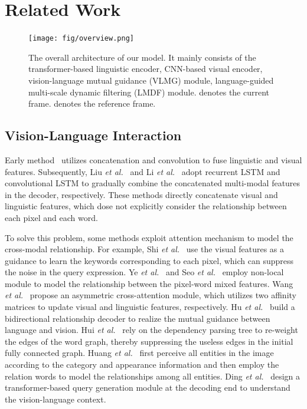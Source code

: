 \documentclass[10pt,twocolumn,letterpaper]{article}
\begin{document}
\section{Related Work}
\label{sec:related}

\begin{figure*}[t]
\centering
\texttt{[image: fig/overview.png]}
\ \\
{\begin{center}
\vspace{-3mm}
\caption{\small{The overall architecture of our model. It mainly consists of the transformer-based linguistic encoder, CNN-based visual encoder, vision-language mutual guidance (VLMG) module, language-guided multi-scale dynamic filtering (LMDF) module.  denotes the current frame.  denotes the reference frame.}}
\label{fig:structure}
\end{center}
}
\vspace{-2mm}
\end{figure*}
\subsection{Vision-Language Interaction}
Early method~\cite{hu2016segmentation} utilizes concatenation and convolution to fuse linguistic and visual features. Subsequently, Liu \emph{et al.}~\cite{liu2017recurrent} and Li \emph{et al.}~\cite{li2018referring} adopt recurrent LSTM and convolutional LSTM to gradually combine the concatenated multi-modal features in the decoder, respectively. These methods directly concatenate visual and linguistic features, which dose not explicitly consider the relationship between each pixel and each word.

To solve this problem, some methods exploit attention mechanism to model the cross-modal relationship. For example, Shi \emph{et al.}~\cite{shi2018key} use the visual features as a guidance to learn the keywords corresponding to each pixel, which can suppress the noise in the query expression. Ye \emph{et al.}~\cite{ye2019cross} and Seo \emph{et al.}~\cite{seo2020urvos} employ non-local module to model the relationship between the pixel-word mixed features. Wang \emph{et al.}~\cite{wang2019asymmetric} propose an asymmetric cross-attention module, which utilizes two affinity matrices to update visual and linguistic features, respectively. Hu \emph{et al.}~\cite{hu2020bi} build a bidirectional relationship decoder to realize the mutual guidance between language and vision. Hui \emph{et al.}~\cite{hui2020linguistic} rely on the dependency parsing tree to re-weight the edges of the word graph, thereby suppressing the useless edges in the initial fully connected graph. Huang \emph{et al.}~\cite{huang2020referring} first perceive all entities in the image according to the category and appearance information and then employ the relation words to model the relationships among all entities.  Ding \emph{et al.}~\cite{ding2021vision} design a transformer-based query generation module at the decoding end to understand the vision-language context.
\end{document}
